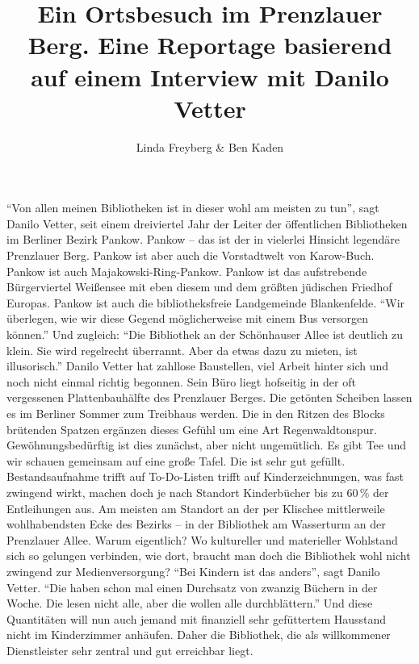 \documentclass[a4paper,
fontsize=11pt,
oneside,
numbers=noperiodatend,
parskip=half-,
bibliography=totoc,
final
]{scrartcl}
\title{\LARGE{Ein Ortsbesuch im Prenzlauer Berg. Eine Reportage basierend auf einem Interview mit Danilo Vetter}} %
\author{Linda Freyberg \& Ben Kaden} %
\date{}
\begin{document}
\maketitle
\thispagestyle{fancyplain} 


\enquote{Von allen meinen Bibliotheken ist in dieser wohl am meisten zu
tun}, sagt Danilo Vetter, seit einem dreiviertel Jahr der Leiter der
öffentlichen Bibliotheken im Berliner Bezirk Pankow. Pankow -- das ist
der in vielerlei Hinsicht legendäre Prenzlauer Berg. Pankow ist aber
auch die Vorstadtwelt von Karow-Buch. Pankow ist auch
Majakowski-Ring-Pankow. Pankow ist das aufstrebende Bürgerviertel
Weißensee mit eben diesem und dem größten jüdischen Friedhof Europas.
Pankow ist auch die bibliotheksfreie Landgemeinde Blankenfelde.
\enquote{Wir überlegen, wie wir diese Gegend möglicherweise mit einem
Bus versorgen können.} Und zugleich: \enquote{Die Bibliothek an der
Schönhauser Allee ist deutlich zu klein. Sie wird regelrecht überrannt.
Aber da etwas dazu zu mieten, ist illusorisch.} Danilo Vetter hat
zahllose Baustellen, viel Arbeit hinter sich und noch nicht einmal
richtig begonnen. Sein Büro liegt hofseitig in der oft vergessenen
Plattenbauhälfte des Prenzlauer Berges. Die getönten Scheiben lassen es
im Berliner Sommer zum Treibhaus werden. Die in den Ritzen des Blocks
brütenden Spatzen ergänzen dieses Gefühl um eine Art Regenwaldtonspur.
Gewöhnungsbedürftig ist dies zunächst, aber nicht ungemütlich. Es gibt
Tee und wir schauen gemeinsam auf eine große Tafel. Die ist sehr gut
gefüllt. Bestandsaufnahme trifft auf To-Do-Listen trifft auf
Kinderzeichnungen, was fast zwingend wirkt, machen doch je nach Standort
Kinderbücher bis zu 60\,\% der Entleihungen aus. Am meisten am Standort
an der per Klischee mittlerweile wohlhabendsten Ecke des Bezirks -- in
der Bibliothek am Wasserturm an der Prenzlauer Allee. Warum eigentlich?
Wo kultureller und materieller Wohlstand sich so gelungen verbinden, wie
dort, braucht man doch die Bibliothek wohl nicht zwingend zur
Medienversorgung? \enquote{Bei Kindern ist das anders}, sagt Danilo
Vetter. \enquote{Die haben schon mal einen Durchsatz von zwanzig Büchern
in der Woche. Die lesen nicht alle, aber die wollen alle durchblättern.}
Und diese Quantitäten will nun auch jemand mit finanziell sehr
gefüttertem Hausstand nicht im Kinderzimmer anhäufen. Daher die
Bibliothek, die als willkommener Dienstleister sehr zentral und gut
erreichbar liegt.
\end{document}
